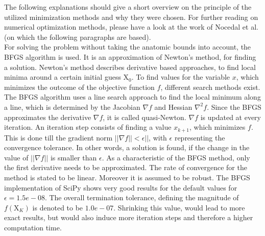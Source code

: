 The following explanations should give a short overview on the principle of the utilized minimization methods and why they were chosen. For further reading on numerical optimization methods, please have a look at the work of Nocedal et al. \cite{nocedal2006numerical} (on which the following paragraphs are based).\\
For solving the problem without taking the anatomic bounds into account, the \ac{BFGS} algorithm is used. It is an approximation of Newton's method, for finding a solution. Newton's method describes derivative based approaches, to find local minima around a certain initial guess $ \mathrm{X}_{0} $. To find values for the variable $ x $, which minimizes the outcome of the objective function $ f $, different search methods exist. The \ac{BFGS} algorithm uses a line search approach to find the local minimum along a line, which is determined by the Jacobian $ \nabla f $ and Hessian $ \nabla^{2} f $. Since the \ac{BFGS} approximates the derivative  $ \nabla f $, it is called quasi-Newton. $ \nabla f $ is updated at every iteration. An iteration step consists of finding a value $ x_{k+1} $, which minimizes $ f $. This is done till the gradient norm $ || \nabla f|| < \epsilon ||$, with $ \epsilon $ representing the convergence tolerance. In other words, a solution is found, if the change in the value of $ ||\nabla f|| $ is smaller than $ \epsilon $. As a characteristic of the \ac{BFGS} method, only the first derivative needs to be approximated. The rate of convergence for the method is stated to be linear. Moreover it is assumed to be robust. The \ac{BFGS} implementation of SciPy shows very good results for the default values for $ \epsilon = 1.5e-08 $. The overall termination tolerance, defining the magnitude of $ f(\mathrm{X}_K) $ is denoted to be $ 1.0e-07 $. Shrinking this value, would lead to more exact results, but would also induce more iteration steps and therefore a higher computation time.\\
